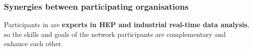 
\vspace{-2mm}
\subsubsection{Synergies between participating organisations}
\label{sec:synergy}

Participants in \acronym are \textbf{experts in HEP and industrial real-time data analysis}, so the skills and goals of the network participants are complementary and enhance each other. 

